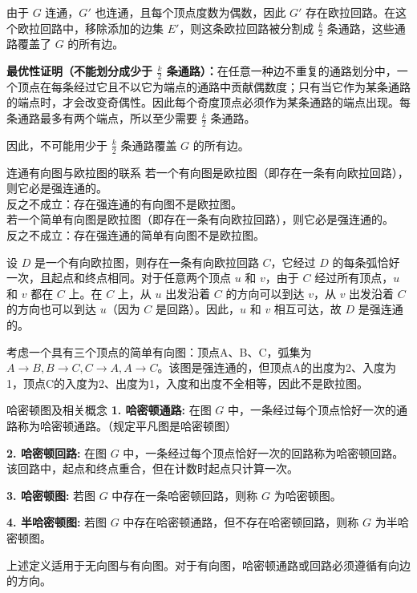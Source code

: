 由于 $G$ 连通，$G'$ 也连通，且每个顶点度数为偶数，因此 $G'$ 存在欧拉回路。在这个欧拉回路中，移除添加的边集 $E'$，则这条欧拉回路被分割成 $\frac{k}{2}$ 条通路，这些通路覆盖了 $G$ 的所有边。
    
\textbf{最优性证明（不能划分成少于 $\frac{k}{2}$ 条通路）：}在任意一种边不重复的通路划分中，一个顶点在每条经过它且不以它为端点的通路中贡献偶数度；只有当它作为某条通路的端点时，才会改变奇偶性。因此每个奇度顶点必须作为某条通路的端点出现。每条通路最多有两个端点，所以至少需要 $\frac{k}{2}$ 条通路。
    
因此，不可能用少于 $\frac{k}{2}$ 条通路覆盖 $G$ 的所有边。
\begin{theorem}{连通有向图与欧拉图的联系}{}
若一个有向图是欧拉图（即存在一条有向欧拉回路），则它必是强连通的。\\
反之不成立：存在强连通的有向图不是欧拉图。\\
若一个简单有向图是欧拉图（即存在一条有向欧拉回路），则它必是强连通的。\\
反之不成立：存在强连通的简单有向图不是欧拉图。
\end{theorem}
设 $D$ 是一个有向欧拉图，则存在一条有向欧拉回路 $C$，它经过 $D$ 的每条弧恰好一次，且起点和终点相同。对于任意两个顶点 $u$ 和 $v$，由于 $C$ 经过所有顶点，$u$ 和 $v$ 都在 $C$ 上。在 $C$ 上，从 $u$ 出发沿着 $C$ 的方向可以到达 $v$，从 $v$ 出发沿着 $C$ 的方向也可以到达 $u$（因为 $C$ 是回路）。因此，$u$ 和 $v$ 相互可达，故 $D$ 是强连通的。

考虑一个具有三个顶点的简单有向图：顶点A、B、C，弧集为$A\to B,B\to C,C\to A,A\to C$。该图是强连通的，但顶点A的出度为2、入度为1，顶点C的入度为2、出度为1，入度和出度不全相等，因此不是欧拉图。
\begin{definition}{哈密顿图及相关概念}{}
    \textbf{1. 哈密顿通路:}
    在图 $G$ 中，一条经过每个顶点恰好一次的通路称为哈密顿通路。（规定平凡图是哈密顿图）

    \textbf{2. 哈密顿回路:}
    在图 $G$ 中，一条经过每个顶点恰好一次的回路称为哈密顿回路。该回路中，起点和终点重合，但在计数时起点只计算一次。

    \textbf{3. 哈密顿图:}
    若图 $G$ 中存在一条哈密顿回路，则称 $G$ 为哈密顿图。

    \textbf{4. 半哈密顿图:}
    若图 $G$ 中存在哈密顿通路，但不存在哈密顿回路，则称 $G$ 为半哈密顿图。
\end{definition}
上述定义适用于无向图与有向图。对于有向图，哈密顿通路或回路必须遵循有向边的方向。

